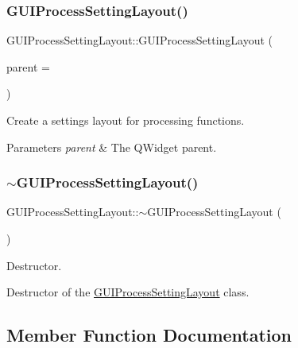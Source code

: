\subsubsection{\texorpdfstring{G\+U\+I\+Process\+Setting\+Layout()}{GUIProcessSettingLayout()}}
{\footnotesize\ttfamily G\+U\+I\+Process\+Setting\+Layout\+::\+G\+U\+I\+Process\+Setting\+Layout (\begin{DoxyParamCaption}\item[{Q\+Widget $\ast$}]{parent = {} }\end{DoxyParamCaption})}



Create a settings layout for processing functions. 


\begin{DoxyParams}{Parameters}
{\em parent} & The Q\+Widget parent. \\
\hline
\end{DoxyParams}
\mbox{\label{class_g_u_i_process_setting_layout_a71b9f40efeb993237ca10beb7f541e3f}} 
\subsubsection{\texorpdfstring{$\sim$\+G\+U\+I\+Process\+Setting\+Layout()}{~GUIProcessSettingLayout()}}
{\footnotesize\ttfamily G\+U\+I\+Process\+Setting\+Layout\+::$\sim$\+G\+U\+I\+Process\+Setting\+Layout (\begin{DoxyParamCaption}{ }\end{DoxyParamCaption})}



Destructor. 

Destructor of the \mbox{\hyperlink{class_g_u_i_process_setting_layout}{G\+U\+I\+Process\+Setting\+Layout}} class. 

\subsection{Member Function Documentation}
\mbox{\label{class_g_u_i_process_setting_layout_a47c96c4baaed4082c55b0359b76e415f}} 
